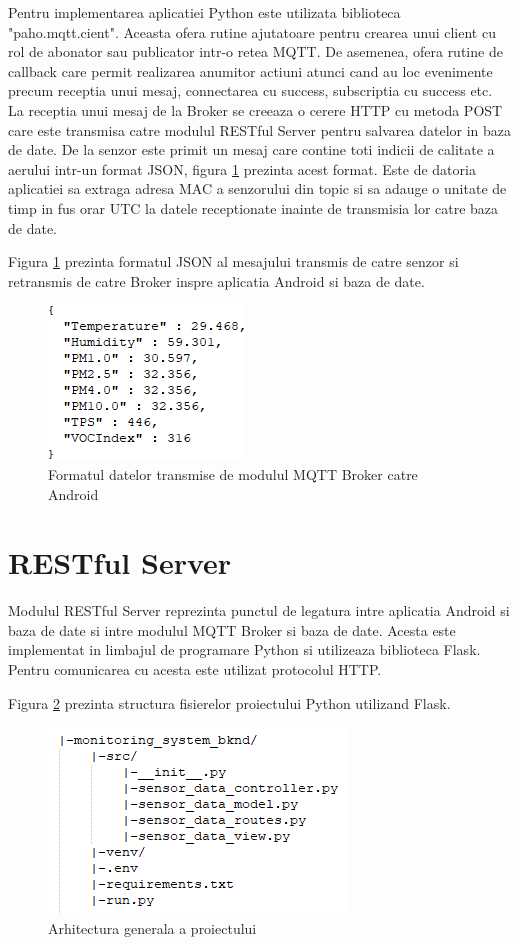Pentru implementarea aplicatiei Python este utilizata biblioteca "paho.mqtt.cient". Aceasta ofera rutine ajutatoare pentru crearea unui client cu rol de abonator sau publicator 
intr-o retea MQTT. De asemenea, ofera rutine de callback care permit realizarea anumitor actiuni atunci cand au loc evenimente precum receptia unui mesaj, connectarea cu 
success, subscriptia cu success etc. La receptia unui mesaj de la Broker se creeaza o cerere HTTP cu metoda POST care este transmisa catre modulul RESTful Server pentru 
salvarea datelor in baza de date. De la senzor este primit un mesaj care contine toti indicii de calitate a aerului intr-un format JSON, figura 
\ref{fig:Mqtt2AndroidDataFormat} prezinta acest format. Este de datoria aplicatiei sa extraga adresa MAC a senzorului din topic si sa adauge o unitate de timp in 
fus orar UTC la datele receptionate inainte de transmisia lor catre baza de date.

Figura \ref{fig:Mqtt2AndroidDataFormat} prezinta formatul JSON al mesajului transmis de catre senzor si retransmis de catre Broker inspre aplicatia Android si baza de date.  
\begin{figure}[H]
    \centering
    \includegraphics[scale=0.8]{figs/Mqtt2AndroidDataFormat.png}
    \caption{Formatul datelor transmise de modulul MQTT Broker catre Android}
    \label{fig:Mqtt2AndroidDataFormat}
\end{figure}

\section{RESTful Server}\label{sec:pi_restserver}
Modulul RESTful Server reprezinta punctul de legatura intre aplicatia Android si baza de date si intre modulul MQTT Broker si baza de date. Acesta este implementat in limbajul 
de programare Python si utilizeaza biblioteca Flask. Pentru comunicarea cu acesta este utilizat protocolul HTTP. 

Figura \ref{fig:PI_RealFlaskProjectStructure} prezinta structura fisierelor proiectului Python utilizand Flask. 
\begin{figure}[H]
    \centering
    \includegraphics[scale=0.9]{figs/PI_RealFlaskProjectStructure.png}
    \caption{Arhitectura generala a proiectului}
    \label{fig:PI_RealFlaskProjectStructure}
\end{figure}

